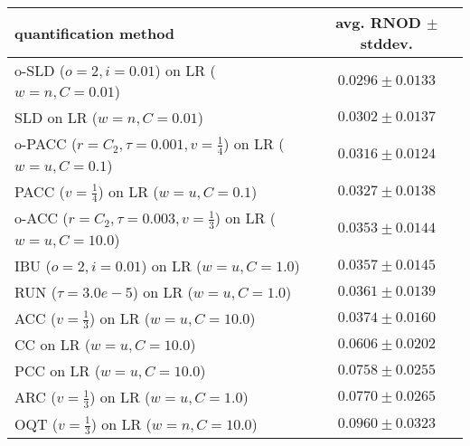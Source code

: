\begin{tabular}{lc}
  \toprule
  quantification method & avg. RNOD $\pm$ stddev. \\
  \midrule
  o-SLD ($o=2, i=0.01$) on LR ($w=n, C=0.01$) & $\mathbf{0.0296 \pm 0.0133}$ \\
  SLD on LR ($w=n, C=0.01$) & $0.0302 \pm 0.0137$ \\
  o-PACC ($r=C_2, \tau=0.001, v=\frac{1}{4}$) on LR ($w=u, C=0.1$) & $0.0316 \pm 0.0124$ \\
  PACC ($v=\frac{1}{4}$) on LR ($w=u, C=0.1$) & $0.0327 \pm 0.0138$ \\
  o-ACC ($r=C_2, \tau=0.003, v=\frac{1}{3}$) on LR ($w=u, C=10.0$) & $0.0353 \pm 0.0144$ \\
  IBU ($o=2, i=0.01$) on LR ($w=u, C=1.0$) & $0.0357 \pm 0.0145$ \\
  RUN ($\tau=3.0e-5$) on LR ($w=u, C=1.0$) & $0.0361 \pm 0.0139$ \\
  ACC ($v=\frac{1}{3}$) on LR ($w=u, C=10.0$) & $0.0374 \pm 0.0160$ \\
  CC on LR ($w=u, C=10.0$) & $0.0606 \pm 0.0202$ \\
  PCC on LR ($w=u, C=10.0$) & $0.0758 \pm 0.0255$ \\
  ARC ($v=\frac{1}{3}$) on LR ($w=u, C=1.0$) & $0.0770 \pm 0.0265$ \\
  OQT ($v=\frac{1}{3}$) on LR ($w=n, C=10.0$) & $0.0960 \pm 0.0323$ \\
  \bottomrule
\end{tabular}

